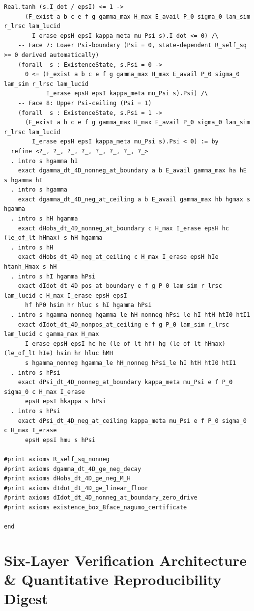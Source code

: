 \documentclass[11pt,a4paper]{article}
\theoremstyle{definition}
\begin{document}
\begin{lstlisting}[language=Lean4]
      Real.tanh (s.I_dot / epsI) <= 1 ->
      (F_exist a b c e f g gamma_max H_max E_avail P_0 sigma_0 lam_sim r_lrsc lam_lucid
        I_erase epsH epsI kappa_meta mu_Psi s).I_dot <= 0) /\
    -- Face 7: Lower Psi-boundary (Psi = 0, state-dependent R_self_sq >= 0 derived automatically)
    (forall  s : ExistenceState, s.Psi = 0 ->
      0 <= (F_exist a b c e f g gamma_max H_max E_avail P_0 sigma_0 lam_sim r_lrsc lam_lucid
            I_erase epsH epsI kappa_meta mu_Psi s).Psi) /\
    -- Face 8: Upper Psi-ceiling (Psi = 1)
    (forall  s : ExistenceState, s.Psi = 1 ->
      (F_exist a b c e f g gamma_max H_max E_avail P_0 sigma_0 lam_sim r_lrsc lam_lucid
        I_erase epsH epsI kappa_meta mu_Psi s).Psi < 0) := by
  refine <?_, ?_, ?_, ?_, ?_, ?_, ?_, ?_>
  . intro s hgamma hI
    exact dgamma_dt_4D_nonneg_at_boundary a b E_avail gamma_max ha hE s hgamma hI
  . intro s hgamma
    exact dgamma_dt_4D_neg_at_ceiling a b E_avail gamma_max hb hgmax s hgamma
  . intro s hH hgamma
    exact dHobs_dt_4D_nonneg_at_boundary c H_max I_erase epsH hc (le_of_lt hHmax) s hH hgamma
  . intro s hH
    exact dHobs_dt_4D_neg_at_ceiling c H_max I_erase epsH hIe htanh_Hmax s hH
  . intro s hI hgamma hPsi
    exact dIdot_dt_4D_pos_at_boundary e f g P_0 lam_sim r_lrsc lam_lucid c H_max I_erase epsH epsI
      hf hP0 hsim hr hluc s hI hgamma hPsi
  . intro s hgamma_nonneg hgamma_le hH_nonneg hPsi_le hI htH htI0 htI1
    exact dIdot_dt_4D_nonpos_at_ceiling e f g P_0 lam_sim r_lrsc lam_lucid c gamma_max H_max
      I_erase epsH epsI hc he (le_of_lt hf) hg (le_of_lt hHmax) (le_of_lt hIe) hsim hr hluc hMH
      s hgamma_nonneg hgamma_le hH_nonneg hPsi_le hI htH htI0 htI1
  . intro s hPsi
    exact dPsi_dt_4D_nonneg_at_boundary kappa_meta mu_Psi e f P_0 sigma_0 c H_max I_erase
      epsH epsI hkappa s hPsi
  . intro s hPsi
    exact dPsi_dt_4D_neg_at_ceiling kappa_meta mu_Psi e f P_0 sigma_0 c H_max I_erase
      epsH epsI hmu s hPsi

#print axioms R_self_sq_nonneg
#print axioms dgamma_dt_4D_ge_neg_decay
#print axioms dHobs_dt_4D_ge_neg_M_H
#print axioms dIdot_dt_4D_ge_linear_floor
#print axioms dIdot_dt_4D_nonneg_at_boundary_zero_drive
#print axioms existence_box_8face_nagumo_certificate

end
\end{lstlisting}

\section{Six-Layer Verification Architecture \& Quantitative Reproducibility Digest}
\label{sec:audit_ledger}
\end{document}

